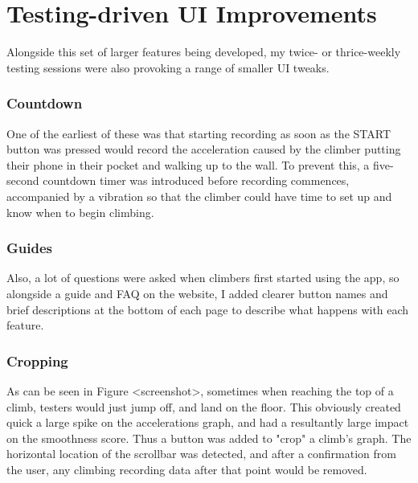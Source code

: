 




\section{Testing-driven UI Improvements}
Alongside this set of larger features being developed, my twice- or thrice-weekly testing sessions were also provoking a range of smaller UI tweaks.

\subsubsection{Countdown}
One of the earliest of these was that starting recording as soon as the START button was pressed would record the acceleration caused by the climber putting their phone in their pocket and walking up to the wall.
To prevent this, a five-second countdown timer was introduced before recording commences, accompanied by a vibration so that the climber could have time to set up and know when to begin climbing.

\subsubsection{Guides}
Also, a lot of questions were asked when climbers first started using the app, so alongside a guide and FAQ on the website, I added clearer button names and brief descriptions at the bottom of each page to describe what happens with each feature.


\subsubsection{Cropping}
As can be seen in Figure <screenshot>, sometimes when reaching the top of a climb, testers would just jump off, and land on the floor.
This obviously created quick a large spike on the accelerations graph, and had a resultantly large impact on the smoothness score.
Thus a button was added to "crop" a climb's graph.
The horizontal location of the scrollbar was detected, and after a confirmation from the user, any climbing recording data after that point would be removed.

